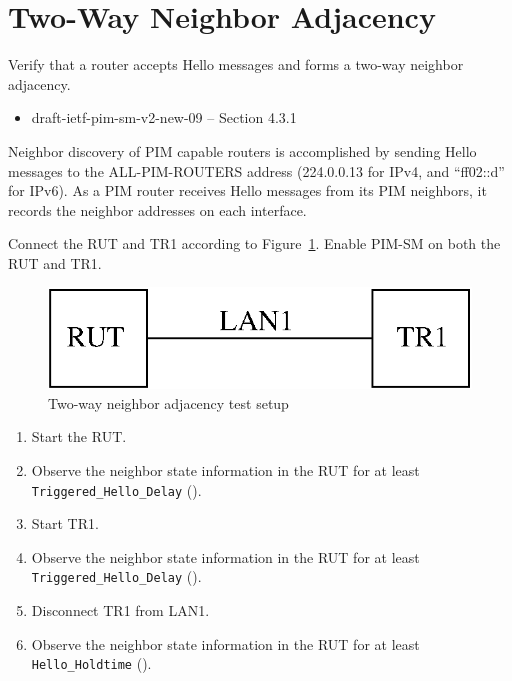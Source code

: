 \documentclass[11pt]{report}
\begin{document}
\newpage
\section{Two-Way Neighbor Adjacency}

Verify that a router accepts Hello messages and forms a two-way neighbor
adjacency.

\begin{itemize}
  \item draft-ietf-pim-sm-v2-new-09 -- Section 4.3.1
\end{itemize}

Neighbor discovery of PIM capable routers is accomplished by sending Hello
messages to the ALL-PIM-ROUTERS address (224.0.0.13 for IPv4,
and ``ff02::d'' for IPv6). As a PIM router receives Hello messages from its
PIM neighbors, it records the neighbor addresses on each interface.

Connect the RUT and TR1 according to
Figure~\ref{fig:pim_test_2_2_two_way_neighbor_adjacency}.
Enable PIM-SM on both the RUT and TR1.

\begin{figure}[htbp]
  \begin{center}
    \includegraphics[scale=0.8]{figs/pim_test_2_2_two_way_neighbor_adjacency}
    \caption{Two-way neighbor adjacency test setup}
    \label{fig:pim_test_2_2_two_way_neighbor_adjacency}
  \end{center}
\end{figure}



\begin{enumerate}

  \item Start the RUT.

  \item Observe the neighbor state information in the RUT for at least
        \verb=Triggered_Hello_Delay= ({\PimsmTriggeredHelloDelay}).

  \item Start TR1.

  \item Observe the neighbor state information in the RUT for at least
        \verb=Triggered_Hello_Delay= ({\PimsmTriggeredHelloDelay}).

  \item Disconnect TR1 from LAN1.

  \item Observe the neighbor state information in the RUT for at least
        \verb=Hello_Holdtime= ({\PimsmHelloHoldtime}).

\end{enumerate}
\end{document}
